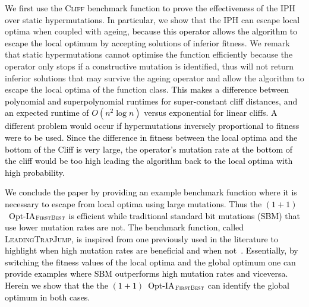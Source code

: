 \documentclass[lettersize,journal]{IEEEtran}
\newcommand{\new}[1]{\textcolor{black}{#1}}
\begin{document}
\new{We first use the \textsc{Cliff} benchmark function to prove the effectiveness of the IPH over static hypermutations. In particular, we show} 
that the IPH can escape local optima when coupled with ageing, \new{because this operator allows the algorithm to escape the local optimum by accepting solutions of inferior fitness.} We remark that static hypermutations cannot optimise the function efficiently because %
the operator only stops if a constructive mutation is identified, thus will not return inferior solutions that may survive the ageing operator and allow the algorithm to escape the local optima of the function class. \new{This makes a difference between polynomial and superpolynomial runtimes for super-constant cliff distances, and an expected runtime of $O(n^2 \log n)$ versus exponential for linear cliffs. 
A different problem would occur if hypermutations inversely proportional to fitness were to be used. Since the difference in fitness between the local optima and the bottom of the Cliff is very large, the operator's mutation rate at the bottom of the cliff would be too high leading the algorithm back to the local optima with high probability.}

\new{We conclude the paper by providing an example benchmark function where it is necessary to escape from local optima using large mutations. Thus the $(1+1)$~Opt-IA$_{\textsc{FirstBest}}$ is efficient while traditional standard bit mutations (SBM) that use lower mutation rates are not. The benchmark function, called \textsc{LeadingTrapJump}, is inspired from one previously used in the literature to highlight when high mutation rates are beneficial and when not~\cite{OlivetoLehreNeumann09}. Essentially, by switching the fitness values of the local optima and the global optimum one can provide examples where SBM outperforms high mutation rates and viceversa. Herein we show that the the $(1+1)$~Opt-IA$_{\textsc{FirstBest}}$ can identify the global optimum in both cases.}
\end{document}
